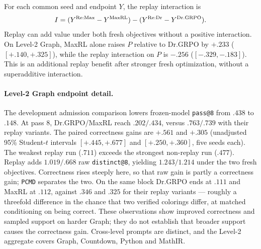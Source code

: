 \documentclass{article}
\newcommand{\1}{\mathbf 1}
\newcommand{\pmd}{\texttt{PCMD}}
\theoremstyle{remark}
\theoremstyle{definition}
\theoremstyle{plain}
\begin{document}
For each common seed and endpoint $Y$, the replay interaction is
\[
 I=(Y^{\rm Re:Max}-Y^{\rm MaxRL})
    -(Y^{\rm Re:Dr}-Y^{\rm Dr.GRPO}).
\]
Replay can add value under both fresh objectives without a positive
interaction. On Level-2 Graph, MaxRL alone raises $P$ relative to Dr.GRPO
by $+.233$ ($[+.140,+.325]$), while the replay interaction on $P$ is
$-.256$ ($[-.329,-.183]$). This is an additional replay benefit after
stronger fresh optimization, without a superadditive interaction.

\begin{table}[H]
  \centering
  \caption{\textbf{Fresh-objective effects and replay interactions on Level 2.}
  All three contrasts within a domain use the same four-arm seed
  intersection. The interaction is
  $(\mathrm{Re:Max}-\mathrm{MaxRL})-
  (\mathrm{Re:Dr}-\mathrm{Dr.GRPO})$.
  Each entry gives its mean and, only for a complete five-seed block, a
  paired unadjusted 95\% Student-$t$ interval. Archived four-arm exports:
  \href{https://huggingface.co/od2961/maxent-grpo-models/blob/main/experiments/E119/README.md\#models}{E119 model index}.}
  \label{tab:level2-factorial-contrasts}
  \scriptsize
  \setlength{\tabcolsep}{3pt}
\end{table}


\paragraph{Level-2 Graph endpoint detail.}
\label{app:levels-numerical-detail}
The development admission comparison lowers frozen-model \texttt{pass@8} from $.438$
to $.148$. At pass 8, Dr.GRPO/MaxRL reach $.202/.434$, versus $.763/.739$
with their replay variants. The paired correctness gains are $+.561$ and
$+.305$ (unadjusted 95\% Student-$t$ intervals $[+.445,+.677]$ and
$[+.250,+.360]$, five seeds each). The weakest replay run ($.711$) exceeds
the strongest non-replay run ($.477$). Replay adds $1.019/.668$ raw
\texttt{distinct@8}, yielding $1.243/1.214$ under the two fresh objectives.
Correctness rises steeply here, so that raw gain is partly a correctness gain;
\pmd{} separates the two. On the same block Dr.GRPO ends at $.111$ and MaxRL at
$.112$, against $.346$ and $.325$ for their replay variants --- roughly a
threefold difference in the chance that two verified colorings differ, at
matched conditioning on being correct.
These observations show improved correctness and sampled support on harder
Graph; they do not establish that broader support causes the correctness
gain. Cross-level prompts are distinct, and the Level-2 aggregate
covers Graph, Countdown, Python and MathIR.
\end{document}
